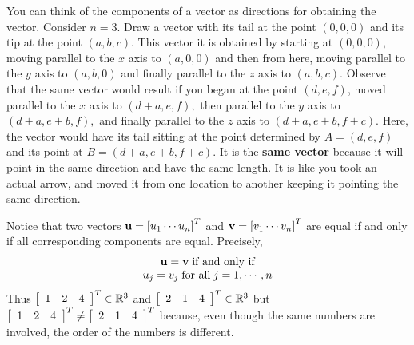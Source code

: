 You can think of the components of a vector as directions for
obtaining the vector. Consider $n=3$.  Draw a vector with its tail at
the point $\left( 0,0,0\right) $ and its tip at the point $\left(
a,b,c\right) $. This vector it is obtained by starting at $\left(
0,0,0\right) $, moving parallel to the $x$ axis to $\left(
a,0,0\right) $ and then from here, moving parallel to the $y$ axis to
$\left( a,b,0\right) $ and finally parallel to the $z$ axis to $\left(
a,b,c\right). $ Observe that the same vector would result if you began
at the point $ \left( d,e,f \right)$, moved parallel to the $x$ axis
to $\left( d+a,e,f\right) ,$ then parallel to the $y$ axis to $\left(
d+a,e+b,f\right) ,$ and finally parallel to the $z$ axis to $\left(
d+a,e+b,f+c\right)$. Here, the vector would have its tail sitting at
the point determined by $A= \left( d,e,f\right) $ and its point at
$B=\left( d+a,e+b,f+c\right)$. It is the \textbf{same vector} because
it will point in the same direction and have the same length. It is
like you took an actual arrow, and moved it from one location to another keeping it pointing
the same direction.

Notice that two vectors ${\bf u} = \left[ u_{1} \cdots u_{n}\right]^T $ and
${\bf v}=\left[ v_{1} \cdots v_{n}\right]^T$ are equal if and only if
all corresponding components are equal. Precisely,
\begin{equation*}
\begin{array}{c}
{\bf u}={\bf v} \; \mbox{if and only if}\\
u_{j}=v_{j} \; \mbox{for all}\; j=1,\cdots ,n
\end{array}
\end{equation*} 
Thus 
$\left[ 
\begin{array}{rrr}
1  & 2 & 4
\end{array}
\right]^T \in \mathbb{R}^{3}$ and $\left[ 
\begin{array}{rrr}
2 & 1 & 4
\end{array}
\right]^T \in
\mathbb{R}^{3}$ but $\left[ 
\begin{array}{rrr}
1 & 2 & 4
\end{array}
\right]^T \neq \left[
\begin{array}{rrr}
2 & 1 & 4
\end{array}
\right]^T $ because,
even though the same numbers are involved, the order of the numbers is different. 
